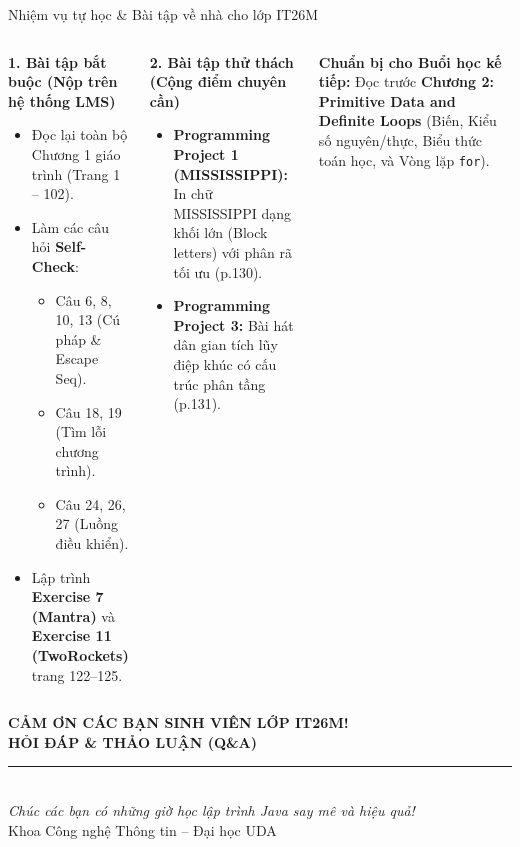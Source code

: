 \documentclass[aspectratio=169, 10pt]{beamer}
\begin{document}
\begin{frame}{Nhiệm vụ tự học \& Bài tập về nhà cho lớp IT26M}
  \begin{columns}[t]
    \begin{block}{\textbf{1. Bài tập bắt buộc (Nộp trên hệ thống LMS)}}
      \begin{itemize}\small
        \item Đọc lại toàn bộ Chương 1 giáo trình (Trang 1 -- 102).
        \item Làm các câu hỏi \textbf{Self-Check}:
          \begin{itemize}\footnotesize
            \item Câu 6, 8, 10, 13 (Cú pháp \& Escape Seq).
            \item Câu 18, 19 (Tìm lỗi chương trình).
            \item Câu 24, 26, 27 (Luồng điều khiển).
          \end{itemize}
        \item Lập trình \textbf{Exercise 7 (Mantra)} và \textbf{Exercise 11 (TwoRockets)} trang 122--125.
      \end{itemize}
    \end{block}

    \begin{block}{\textbf{2. Bài tập thử thách (Cộng điểm chuyên cần)}}
      \begin{itemize}\small
        \item \textbf{Programming Project 1 (MISSISSIPPI):} In chữ MISSISSIPPI dạng khối lớn (Block letters) với phân rã tối ưu (p.130).
        \item \textbf{Programming Project 3:} Bài hát dân gian tích lũy điệp khúc có cấu trúc phân tầng (p.131).
      \end{itemize}
    \end{block}
    \vspace{1mm}
    \begin{alertblock}{\textbf{Chuẩn bị cho Buổi học kế tiếp:}}
      \small Đọc trước \textbf{Chương 2: Primitive Data and Definite Loops} (Biến, Kiểu số nguyên/thực, Biểu thức toán học, và Vòng lặp \texttt{for}).
    \end{alertblock}
  \end{columns}
\end{frame}

\begin{frame}[plain]
  \begin{center}
    \vspace{1.5cm}
    {\Huge \textcolor{UniNavy}{\textbf{CẢM ƠN CÁC BẠN SINH VIÊN LỚP IT26M!}}}\\[6mm]
    {\Large \textbf{HỎI ĐÁP \& THẢO LUẬN (Q\&A)}}\\[4mm]
    \rule{0.4\textwidth}{1pt}\\[4mm]
    \textit{Chúc các bạn có những giờ học lập trình Java say mê và hiệu quả!}\\[8mm]
    \small Khoa Công nghệ Thông tin -- Đại học UDA
  \end{center}
\end{frame}
\end{document}
